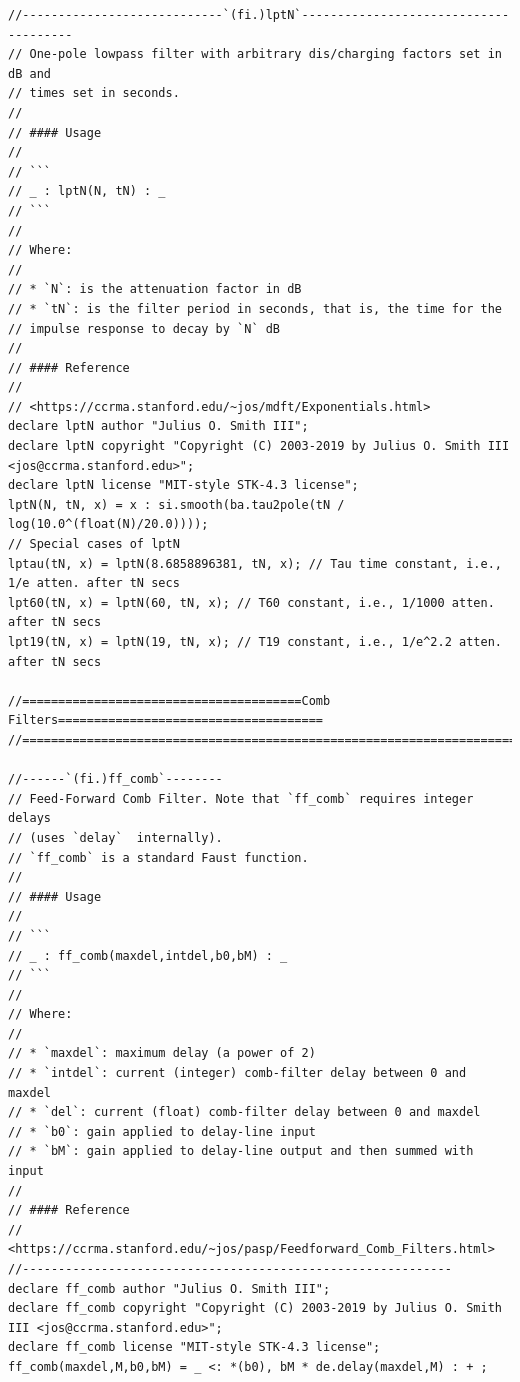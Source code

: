 \documentclass{article}
\begin{document}
\begin{lstlisting}[caption=\texttt{filters.lib}]
//----------------------------`(fi.)lptN`--------------------------------------
// One-pole lowpass filter with arbitrary dis/charging factors set in dB and
// times set in seconds.
//
// #### Usage
//
// ```
// _ : lptN(N, tN) : _
// ```
//
// Where:
//
// * `N`: is the attenuation factor in dB
// * `tN`: is the filter period in seconds, that is, the time for the
// impulse response to decay by `N` dB
//
// #### Reference
//
// <https://ccrma.stanford.edu/~jos/mdft/Exponentials.html>
declare lptN author "Julius O. Smith III";
declare lptN copyright "Copyright (C) 2003-2019 by Julius O. Smith III <jos@ccrma.stanford.edu>";
declare lptN license "MIT-style STK-4.3 license";
lptN(N, tN, x) = x : si.smooth(ba.tau2pole(tN / log(10.0^(float(N)/20.0))));
// Special cases of lptN
lptau(tN, x) = lptN(8.6858896381, tN, x); // Tau time constant, i.e., 1/e atten. after tN secs
lpt60(tN, x) = lptN(60, tN, x); // T60 constant, i.e., 1/1000 atten. after tN secs
lpt19(tN, x) = lptN(19, tN, x); // T19 constant, i.e., 1/e^2.2 atten. after tN secs

//=======================================Comb Filters=====================================
//========================================================================================

//------`(fi.)ff_comb`--------
// Feed-Forward Comb Filter. Note that `ff_comb` requires integer delays
// (uses `delay`  internally).
// `ff_comb` is a standard Faust function.
//
// #### Usage
//
// ```
// _ : ff_comb(maxdel,intdel,b0,bM) : _
// ```
//
// Where:
//
// * `maxdel`: maximum delay (a power of 2)
// * `intdel`: current (integer) comb-filter delay between 0 and maxdel
// * `del`: current (float) comb-filter delay between 0 and maxdel
// * `b0`: gain applied to delay-line input
// * `bM`: gain applied to delay-line output and then summed with input
//
// #### Reference
// <https://ccrma.stanford.edu/~jos/pasp/Feedforward_Comb_Filters.html>
//------------------------------------------------------------
declare ff_comb author "Julius O. Smith III";
declare ff_comb copyright "Copyright (C) 2003-2019 by Julius O. Smith III <jos@ccrma.stanford.edu>";
declare ff_comb license "MIT-style STK-4.3 license";
ff_comb(maxdel,M,b0,bM) = _ <: *(b0), bM * de.delay(maxdel,M) : + ;


\end{lstlisting}
\end{document}
